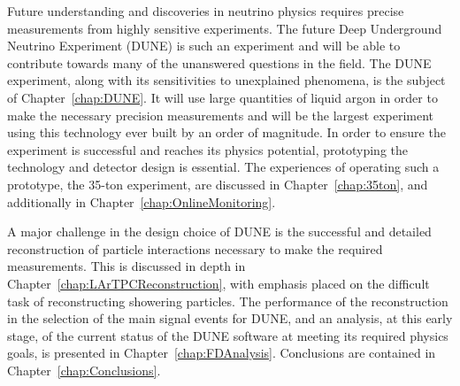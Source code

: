 Future understanding and discoveries in neutrino physics requires precise measurements from highly sensitive experiments.  The future Deep Underground Neutrino Experiment (DUNE) is such an experiment and will be able to contribute towards many of the unanswered questions in the field.  The DUNE experiment, along with its sensitivities to unexplained phenomena, is the subject of Chapter~\ref{chap:DUNE}.  It will use large quantities of liquid argon in order to make the necessary precision measurements and will be the largest experiment using this technology ever built by an order of magnitude.  In order to ensure the experiment is successful and reaches its physics potential, prototyping the technology and detector design is essential.  The experiences of operating such a prototype, the 35-ton experiment, are discussed in Chapter~\ref{chap:35ton}, and additionally in Chapter~\ref{chap:OnlineMonitoring}.

A major challenge in the design choice of DUNE is the successful and detailed reconstruction of particle interactions necessary to make the required measurements.  This is discussed in depth in Chapter~\ref{chap:LArTPCReconstruction}, with emphasis placed on the difficult task of reconstructing showering particles.  The performance of the reconstruction in the selection of the main signal events for DUNE, and an analysis, at this early stage, of the current status of the DUNE software at meeting its required physics goals, is presented in Chapter~\ref{chap:FDAnalysis}.  Conclusions are contained in Chapter~\ref{chap:Conclusions}.
